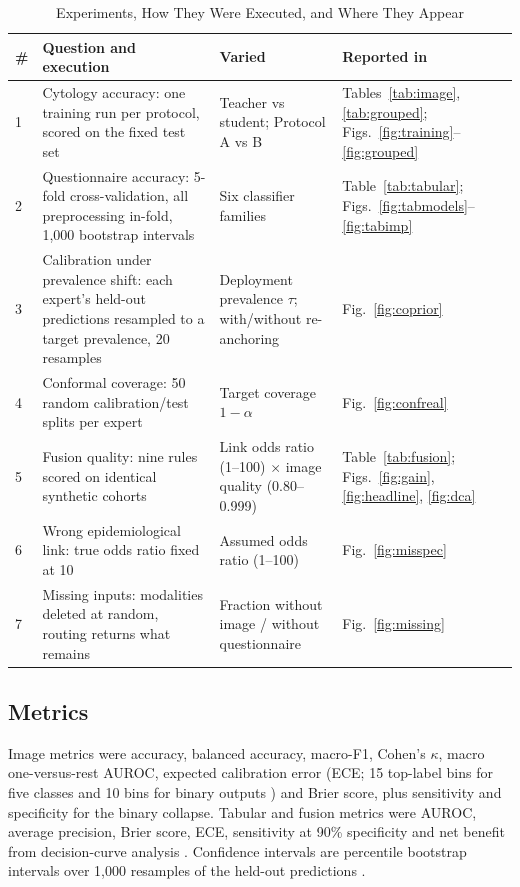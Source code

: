 \documentclass[lettersize,journal]{IEEEtran}
\begin{document}
\begin{table}[t]
\caption{Experiments, How They Were Executed, and Where They Appear}
\label{tab:experiments}
\centering\footnotesize
\setlength{\tabcolsep}{3pt}
\begin{tabular}{@{}p{}p{}p{}p{}@{}}
\toprule
\# & Question and execution & Varied & Reported in \\
\midrule
1 & Cytology accuracy: one training run per protocol, scored on the fixed test set & Teacher vs student; Protocol A vs B & Tables~\ref{tab:image}, \ref{tab:grouped}; Figs.~\ref{fig:training}--\ref{fig:grouped} \\
2 & Questionnaire accuracy: 5-fold cross-validation, all preprocessing in-fold, 1,000 bootstrap intervals & Six classifier families & Table~\ref{tab:tabular}; Figs.~\ref{fig:tabmodels}--\ref{fig:tabimp} \\
3 & Calibration under prevalence shift: each expert's held-out predictions resampled to a target prevalence, 20 resamples & Deployment prevalence $\tau$; with/without re-anchoring & Fig.~\ref{fig:coprior} \\
4 & Conformal coverage: 50 random calibration/test splits per expert & Target coverage $1-\alpha$ & Fig.~\ref{fig:confreal} \\
5 & Fusion quality: nine rules scored on identical synthetic cohorts & Link odds ratio (1--100) $\times$ image quality (0.80--0.999) & Table~\ref{tab:fusion}; Figs.~\ref{fig:gain}, \ref{fig:headline}, \ref{fig:dca} \\
6 & Wrong epidemiological link: true odds ratio fixed at 10 & Assumed odds ratio (1--100) & Fig.~\ref{fig:misspec} \\
7 & Missing inputs: modalities deleted at random, routing returns what remains & Fraction without image / without questionnaire & Fig.~\ref{fig:missing} \\
\bottomrule
\end{tabular}
\end{table}

\subsection{Metrics}
Image metrics were accuracy, balanced accuracy, macro-F1, Cohen's $\kappa$, macro one-versus-rest AUROC, expected calibration error (ECE; 15 top-label bins for five classes and 10 bins for binary outputs \cite{guo2017calibration}) and Brier score, plus sensitivity and specificity for the binary collapse. Tabular and fusion metrics were AUROC, average precision, Brier score, ECE, sensitivity at 90\% specificity and net benefit from decision-curve analysis \cite{vickers2006decision}. Confidence intervals are percentile bootstrap intervals over 1,000 resamples of the held-out predictions \cite{efron1994bootstrap}.
\end{document}

